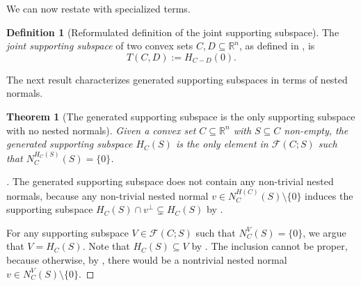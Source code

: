\documentclass{article}
\theoremstyle{plain}
\newtheorem{theorem}{Theorem}[section]
\theoremstyle{definition}
\newtheorem{definition}{Definition}[section]
\theoremstyle{remark}
\begin{document}
We can now restate  with
specialized terms.
\begin{definition}[Reformulated definition of the joint supporting subspace]
\label{loc:the_joint_supporting_subspace.technical}
The \emph{joint supporting subspace} of two convex sets $C, D \subseteq \mathbb{R}^n$, as defined in , is
\begin{equation*}
T(C, D) := H_{C-D}(0).
\end{equation*}
\end{definition}
The next result characterizes generated supporting subspaces in terms of nested normals.
\begin{theorem}[The generated supporting subspace is the only supporting subspace with no nested normals]
\label{loc:the_generated_supporting_subspace_is_the_only_supporting_subspace_with_no_nested_normals.statement}
Given a convex set $C \subseteq \mathbb{R}^n$ with $S \subseteq C$ non-empty, the \emph{generated supporting subspace} $H_C(S)$
is the only element in $\mathcal{F}(C;S)$ 
such that $N_C^{H_C(S)}(S) = \{0\}$.
\end{theorem}
\begin{proof}[\hypertarget{loc:the_generated_supporting_subspace_is_the_only_supporting_subspace_with_no_nested_normals.proof}Proof of \Cref{loc:the_generated_supporting_subspace_is_the_only_supporting_subspace_with_no_nested_normals.statement}]

The generated supporting subspace does not contain any non-trivial nested normals, because any non-trivial nested normal $v \in N_C^{H(C)}(S) \setminus \{0\}$ induces the supporting subspace $H_C(S) \cap v^\perp \subsetneq H_C(S)$ by .

For any supporting subspace $V \in \mathcal{F}(C;S)$ such that $N_C^V(S)= \{0\}$,
we argue that $V = H_C(S)$. Note that $H_C(S) \subseteq V$ by .
The inclusion cannot be proper, because otherwise, by , there would be a nontrivial nested normal $v \in N_C^V(S)\setminus \{0\}$.
\end{proof}
\end{document}
